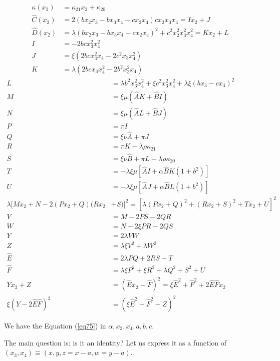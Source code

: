 \documentclass[12pt]{article}
\numberwithin{table}{section}
\begin{document}
\begin{align}
\kappa(x_2) &= \kappa_{21} x_2 + \kappa_{20}\\
\hat C(x_2) &= 2(bx_2x_3 - b x_3x_4 - cx_2 x_4 )cx_2 x_3 x_4 = Ix_2 + J \\
\hat D(x_2) &= \lambda (bx_2x_3 - b x_3x_4 - cx_2 x_4 )^2 + c^2x_2^2 x_3^2 x_4^2 = K x_2 + L \\
I &= - 2b cx_3^2x_4^2\\
J &= \xi (2bcx_3^2 x_4 - 2c^2 x_3 x_4^2)\\
K &= \lambda (2bc x_3 x_4^2 - 2b^2x_3^2 x_4 )\end{align}
\begin{align}
L &= \lambda b^2 x_3^2 x_4^2 + \xi c^2x_3^2 x_4^2+\lambda \xi (bx_3 - c x_4)^2\\
M &= \xi \mu(\hat AK  + \hat BI ) \\
N &= \xi \mu(\hat AL + \hat BJ) \\
P &= \pi I \\
Q &= \xi \nu \hat A + \pi J \\
R &= \pi K - \lambda \rho \kappa_{21}  \\
S &=\xi \nu \hat B + \pi L - \lambda \rho \kappa_{20} \\ 
T &= - \lambda \xi \mu [\hat AI  + \alpha\hat BK  (1 + b^2)]\\
U &= - \lambda\xi \mu [\hat A J + \alpha\hat B L(1 + b^2)]\\
\lambda [Mx_2 + N -2 (Px_2 + Q)(Rx_2 &+ S) ]^2  = [\lambda\left(Px_2 + Q\right)^2 + \left(Rx_2 + S\right) ^2 + T x_2 + U]^2 \\
V &= M-2PS -2 QR\\
W &= N -2\xi PR-2 QS \\
Y &= 2\lambda VW\\
Z &= \lambda\xi V^2 + \lambda W^2 \\
\hat E &= 2\lambda PQ + 2RS + T\\
\hat F &= \lambda\xi P^2 +\xi R^2 + \lambda Q^2 + S^2 + U \\
Yx_2 + Z &= (\hat E x_2 + \hat F)^2 =  \xi \hat E^2 + \hat F^2 + 2\hat E\hat F x_2 \\
\xi (Y - 2\hat E\hat F)^2 &= \left(\xi \hat E^2 + \hat F^2 - Z\right)^2 \label{eq75}
\end{align}

We have the Equation (\ref{eq75}) in $\alpha, x_3, x_4, a, b, c$.

The main question is: is it an identity? Let us express it as a function of $(x_3,x_4) \equiv (x,y,z=x-a,w=y-a)$.
\end{document}
